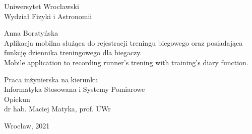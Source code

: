 \documentclass[a4paper,12pt,reqno]{article}
\begin{document}


\begin{center}

\thispagestyle{empty}

\Large 
Uniwersytet Wrocławski\\
Wydział Fizyki i Astronomii\\
\vspace{0.8cm}
\vspace{1.8cm}

\Large Anna Boratyńska \\
\vspace{3.2cm}
\Large Aplikacja mobilna służąca do rejestracji treningu biegowego oraz posiadająca funkcję dziennika treningowego dla biegaczy. \\
\vspace{1.5cm}
Mobile application to recording runner's trening with training's diary function.
\end{center}
\vspace{3.7cm}
\begin{flushright}
\large{ Praca inżynierska na kierunku \\Informatyka Stosowana i Systemy Pomiarowe \\}
\vspace{0.5cm}
\large{ Opiekun \\ dr hab. Maciej Matyka, prof. UWr}
\end{flushright}
\vspace{2.2cm}

\begin{center}
\large Wrocław, 2021
\end{center}
\newpage

\tableofcontents

\newpage
\end{document}
